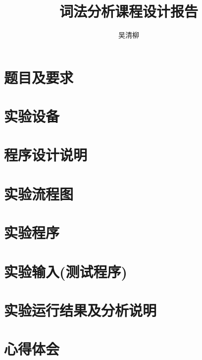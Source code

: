 \documentclass[12pt]{article}
\title{词法分析课程设计报告}
\author{\textup{吴清柳}}
\begin{document}

\tableofcontents
\newpage

\section{题目及要求}

\section{实验设备}

\section{程序设计说明}

\section{实验流程图}

\section{实验程序}

\section{实验输入(测试程序)}

\section{实验运行结果及分析说明}

\section{心得体会}


% 
% 
\end{document}
